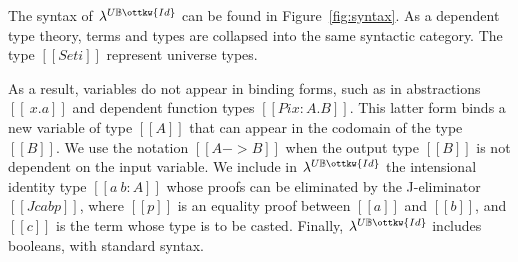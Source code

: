 \documentclass[acmsmall,screen=true,
\ifpublic review=false\else,review=true\fi
  ,anonymous=\ifanonymous true\else false\fi]{acmart}
\newcommand{\lang}{$\lambda^{U\mathbb{B}\ottkw{Id}}$\xspace}
\newcommand{\scw}[1]{}
\newcommand{\yl}[1]{}
\begin{document}
The syntax of \lang can be found in Figure~\ref{fig:syntax}.  As a dependent
type theory, terms and types are collapsed into the same syntactic
category. The type $[[Set i]]$ represent universe types.%
\yl{need to fix the text}
As a result, variables do not appear in binding forms, such as in
abstractions $[[ \ x . a ]]$ and dependent function types $[[Pi x : A . B]]$.  This latter
form binds a new variable of type $[[A]]$ that can appear in the codomain of
the type $[[B]]$.  We use the notation $[[A -> B]]$ when the output type
$[[B]]$ is not dependent on the input variable.
We include in \lang{} the intensional identity type
$[[a ~ b : A]]$ whose proofs can be eliminated by the J-eliminator
$[[J c a b p]]$, where $[[p]]$ is an equality proof between $[[a]]$ and
$[[b]]$, and $[[c]]$ is the term whose type is to be casted.
Finally, \lang{} includes booleans, with standard syntax.
\scw{Example of
 what you can use identity types for? Or an example of a program that uses
J?}

\end{document}
